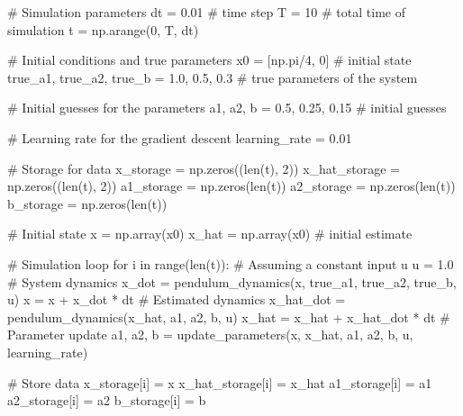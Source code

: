 \documentclass{article}
\begin{document}
\begin{python}
# Simulation parameters
dt = 0.01  # time step
T = 10     # total time of simulation
t = np.arange(0, T, dt)

# Initial conditions and true parameters
x0 = [np.pi/4, 0]  # initial state
true_a1, true_a2, true_b = 1.0, 0.5, 0.3  # true parameters of the system

# Initial guesses for the parameters
a1, a2, b = 0.5, 0.25, 0.15  # initial guesses

# Learning rate for the gradient descent
learning_rate = 0.01

# Storage for data
x_storage = np.zeros((len(t), 2))
x_hat_storage = np.zeros((len(t), 2))
a1_storage = np.zeros(len(t))
a2_storage = np.zeros(len(t))
b_storage = np.zeros(len(t))

# Initial state
x = np.array(x0)
x_hat = np.array(x0)  # initial estimate

# Simulation loop
for i in range(len(t)):
    # Assuming a constant input u
    u = 1.0
    # System dynamics
    x_dot = pendulum_dynamics(x, true_a1, true_a2, true_b, u)
    x = x + x_dot * dt
    # Estimated dynamics
    x_hat_dot = pendulum_dynamics(x_hat, a1, a2, b, u)
    x_hat = x_hat + x_hat_dot * dt
    # Parameter update
    a1, a2, b = update_parameters(x, x_hat, a1, a2, b, u, learning_rate)

    # Store data
    x_storage[i] = x
    x_hat_storage[i] = x_hat
    a1_storage[i] = a1
    a2_storage[i] = a2
    b_storage[i] = b
\end{python}
\end{document}

